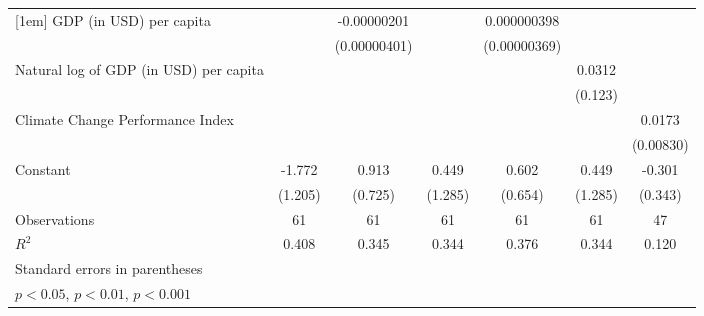 {\begin{tabular}{l*{6}{c}}
[1em]
GDP (in USD) per capita&                     & -0.00000201         &                     & 0.000000398         &                     &                     \\
                    &                     &(0.00000401)         &                     &(0.00000369)         &                     &                     \\
[1em]
Natural log of GDP (in USD) per capita&                     &                     &                     &                     &      0.0312         &                     \\
                    &                     &                     &                     &                     &     (0.123)         &                     \\
[1em]
Climate Change Performance Index&                     &                     &                     &                     &                     &      0.0173         \\
                    &                     &                     &                     &                     &                     &   (0.00830)         \\
[1em]
Constant            &      -1.772         &       0.913         &       0.449         &       0.602         &       0.449         &      -0.301         \\
                    &     (1.205)         &     (0.725)         &     (1.285)         &     (0.654)         &     (1.285)         &     (0.343)         \\
\hline
Observations        &          61         &          61         &          61         &          61         &          61         &          47         \\
\(R^{2}\)           &       0.408         &       0.345         &       0.344         &       0.376         &       0.344         &       0.120         \\
\hline\hline
\multicolumn{7}{l}{\footnotesize Standard errors in parentheses}\\
\multicolumn{7}{l}{\footnotesize \sym{*} \(p<0.05\), \sym{**} \(p<0.01\), \sym{***} \(p<0.001\)}\\
\end{tabular}
}
